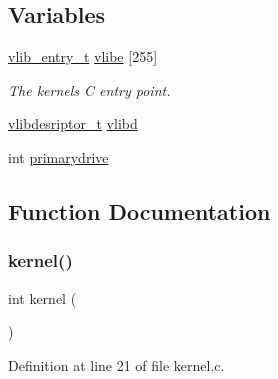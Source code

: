 \subsection*{Variables}
\begin{DoxyCompactItemize}
\item 
\hyperlink{a00188_a97c1a7136f2ab06368e93c2d7533d619_a97c1a7136f2ab06368e93c2d7533d619}{vlib\+\_\+entry\+\_\+t} \hyperlink{a00062_af69f4f709fdab28dec6b8fb75fb4d526_af69f4f709fdab28dec6b8fb75fb4d526}{vlibe} \mbox{[}255\mbox{]}
\begin{DoxyCompactList}\small\item\em The kernels C entry point. \end{DoxyCompactList}\item 
\hyperlink{a00188_a2d9000b4fbb25c5ed2950a2d8f4921d5_a2d9000b4fbb25c5ed2950a2d8f4921d5}{vlibdesriptor\+\_\+t} \hyperlink{a00062_a2125beec541d04796805161dbec05fcf_a2125beec541d04796805161dbec05fcf}{vlibd}
\item 
int \hyperlink{a00062_af37cb131d8a2101addfbf5fb2d8a53b4_af37cb131d8a2101addfbf5fb2d8a53b4}{primarydrive}
\end{DoxyCompactItemize}


\subsection{Function Documentation}
\mbox{\label{a00062_a4ee3d1f05046b7afc6b4d516bf10667a_a4ee3d1f05046b7afc6b4d516bf10667a}} 
\subsubsection{\texorpdfstring{kernel()}{kernel()}}
{\footnotesize\ttfamily int kernel (\begin{DoxyParamCaption}{ }\end{DoxyParamCaption})}



Definition at line 21 of file kernel.\+c.


